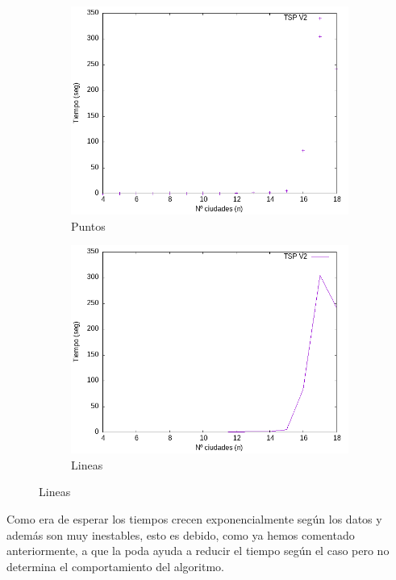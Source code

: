 \documentclass{article}
\begin{document}
\begin{figure}[H]
    \centering
    \begin{subfigure}[b]{0.45\textwidth}
        \centering
        \includegraphics[width=\textwidth]{Sucio_Olga/BB_ajuste2/salidaSoloPuntos.png}
        \caption{Puntos}
    \end{subfigure}
    \begin{subfigure}[b]{0.45\textwidth}
        \centering
        \includegraphics[width=\textwidth]{Sucio_Olga/BB_ajuste2/salidaSoloLineas.png}
        \caption{Lineas}
    \end{subfigure}
\end{figure}

Como era de esperar los tiempos crecen exponencialmente según los datos y además son muy inestables, esto es debido, como ya hemos comentado anteriormente, a que la poda ayuda a reducir el tiempo según el caso pero no determina el comportamiento del algoritmo. 
\end{document}
